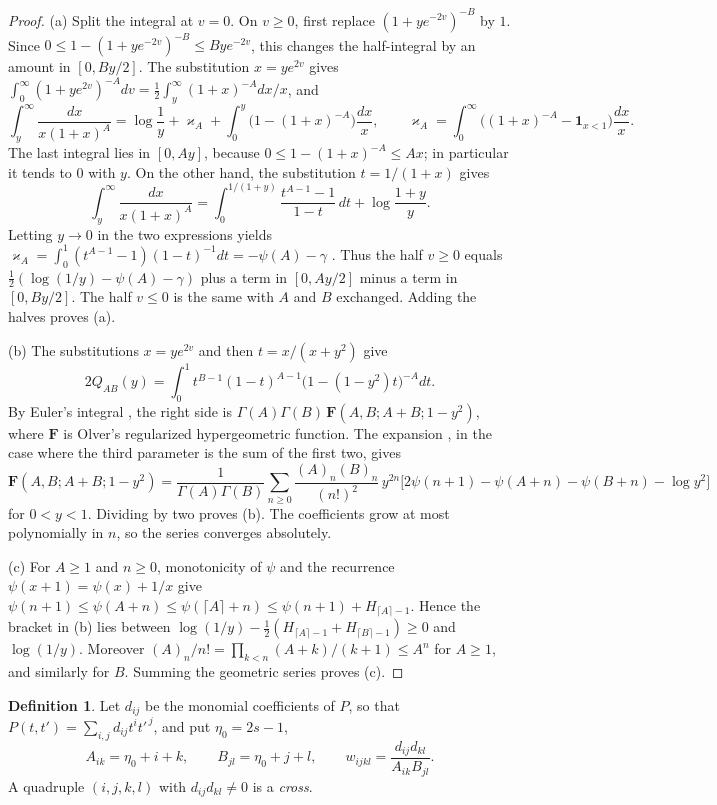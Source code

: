 \documentclass[11pt]{amsart}
\numberwithin{equation}{section}
\theoremstyle{definition}
\newtheorem{definition}[equation]{Definition}
\theoremstyle{remark}
\begin{document}
\begin{proof}
(a) Split the integral at $v=0$. On $v\ge0$, first replace
$(1+ye^{-2v})^{-B}$ by $1$. Since
$0\le1-(1+ye^{-2v})^{-B}\le Bye^{-2v}$, this changes the half-integral
by an amount in $[0,By/2]$. The substitution $x=ye^{2v}$ gives
$\int_0^\infty(1+ye^{2v})^{-A}dv=\frac12\int_y^\infty(1+x)^{-A}dx/x$,
and
\[
 \int_y^\infty\frac{dx}{x(1+x)^A}
 =\log\frac1y+\varkappa_A+\int_0^y\bigl(1-(1+x)^{-A}\bigr)\frac{dx}x,\qquad
 \varkappa_A=\int_0^\infty\bigl((1+x)^{-A}-\mathbf 1_{x<1}\bigr)\frac{dx}x .
\]
The last integral lies in $[0,Ay]$, because $0\le1-(1+x)^{-A}\le Ax$;
in particular it tends to $0$ with $y$. On the other hand, the
substitution $t=1/(1+x)$ gives
\[
 \int_y^\infty\frac{dx}{x(1+x)^A}
 =\int_0^{1/(1+y)}\frac{t^{A-1}-1}{1-t}\,dt+\log\frac{1+y}y .
\]
Letting $y\to0$ in the two expressions yields
$\varkappa_A=\int_0^1(t^{A-1}-1)(1-t)^{-1}dt=-\psi(A)-\gamma$
\cite[Equation~(5.9.16)]{DLMF}. Thus the half $v\ge0$ equals
$\frac12(\log(1/y)-\psi(A)-\gamma)$ plus a term in $[0,Ay/2]$ minus a
term in $[0,By/2]$. The half $v\le0$ is the same with $A$ and $B$
exchanged. Adding the halves proves (a).

(b) The substitutions $x=ye^{2v}$ and then $t=x/(x+y^2)$ give
\[
 2Q_{AB}(y)=\int_0^1t^{B-1}(1-t)^{A-1}\bigl(1-(1-y^2)t\bigr)^{-A}dt .
\]
By Euler's integral \cite[Equation~(15.6.1)]{DLMF}, the right side is
$\Gamma(A)\Gamma(B)\,\mathbf F(A,B;A+B;1-y^2)$, where $\mathbf F$ is
Olver's regularized hypergeometric function. The expansion
\cite[Equation~(15.8.10)]{DLMF}, in the case where the third parameter
is the sum of the first two, gives
\[
 \mathbf F(A,B;A+B;1-y^2)=\frac1{\Gamma(A)\Gamma(B)}\sum_{n\ge0}
 \frac{(A)_n(B)_n}{(n!)^2}\,y^{2n}\bigl[2\psi(n+1)-\psi(A+n)-\psi(B+n)
 -\log y^2\bigr]
\]
for $0<y<1$. Dividing by two proves (b). The coefficients grow at most
polynomially in $n$, so the series converges absolutely.

(c) For $A\ge1$ and $n\ge0$, monotonicity of $\psi$ and the recurrence
$\psi(x+1)=\psi(x)+1/x$ give
$\psi(n+1)\le\psi(A+n)\le\psi(\lceil A\rceil+n)\le\psi(n+1)+H_{\lceil
A\rceil-1}$. Hence the bracket in (b) lies between
$\log(1/y)-\frac12(H_{\lceil A\rceil-1}+H_{\lceil B\rceil-1})\ge0$ and
$\log(1/y)$. Moreover $(A)_n/n!=\prod_{k<n}(A+k)/(k+1)\le A^n$ for
$A\ge1$, and similarly for $B$. Summing the geometric series proves
(c).
\end{proof}

\begin{definition}\label{pf:cross}
Let $d_{ij}$ be the monomial coefficients of $P$, so that
$P(t,t')=\sum_{i,j}d_{ij}t^it'^{\,j}$, and put $\eta_0=2s-1$,
\[
 A_{ik}=\eta_0+i+k,\qquad B_{jl}=\eta_0+j+l,\qquad
 w_{ijkl}=\frac{d_{ij}d_{kl}}{A_{ik}B_{jl}} .
\]
A quadruple $(i,j,k,l)$ with $d_{ij}d_{kl}\ne0$ is a \emph{cross}.
\end{definition}
\end{document}
